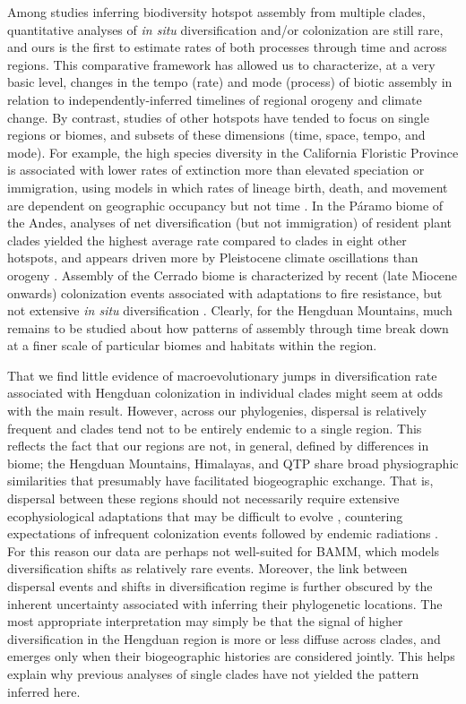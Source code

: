 Among studies inferring biodiversity hotspot assembly from multiple clades, quantitative analyses of \textit{in situ} diversification and/or colonization are still rare, and ours is the first to estimate rates of both processes through time and across regions. This comparative framework has allowed us to characterize, at a very basic level, changes in the tempo (rate) and mode (process) of biotic assembly in relation to independently-inferred timelines of regional orogeny and climate change. By contrast, studies of other hotspots have tended to focus on single regions or biomes, and subsets of these dimensions (time, space, tempo, and mode). For example, the high species diversity in the California Floristic Province is associated with lower rates of extinction more than elevated speciation or immigration, using models in which rates of lineage birth, death, and movement are dependent on geographic occupancy but not time \citep{lancaster2013}. In the Páramo biome of the Andes, analyses of net diversification (but not immigration) of resident plant clades yielded the highest average rate compared to clades in eight other hotspots, and appears driven more by Pleistocene climate oscillations than orogeny \citep{Madrinan2013}. Assembly of the Cerrado biome is characterized by recent (late Miocene onwards) colonization events associated with adaptations to fire resistance, but not extensive \textit{in situ} diversification \citep{simon2009}. Clearly, for the Hengduan Mountains, much remains to be studied about how patterns of assembly through time break down at a finer scale of particular biomes and habitats within the region.

That we find little evidence of macroevolutionary jumps in diversification rate associated with Hengduan colonization in individual clades might seem at odds with the main result. However, across our phylogenies, dispersal is relatively frequent and clades tend not to be entirely endemic to a single region. This reflects the fact that our regions are not, in general, defined by differences in biome; the Hengduan Mountains, Himalayas, and QTP share broad physiographic similarities that presumably have facilitated biogeographic exchange. That is, dispersal between these regions should not necessarily require extensive ecophysiological adaptations that may be difficult to evolve \citep{Donoghue2014}, countering expectations of infrequent colonization events followed by endemic radiations \citep[cf.][]{Hughes2006}. For this reason our data are perhaps not well-suited for BAMM, which models diversification shifts as relatively rare events. Moreover, the link between dispersal events and shifts in diversification regime is further obscured by the inherent uncertainty associated with inferring their phylogenetic locations. The most appropriate interpretation may simply be that the signal of higher diversification in the Hengduan region is more or less diffuse across clades, and emerges only when their biogeographic histories are considered jointly. This helps explain why previous analyses of single clades have not yielded the pattern inferred here.

